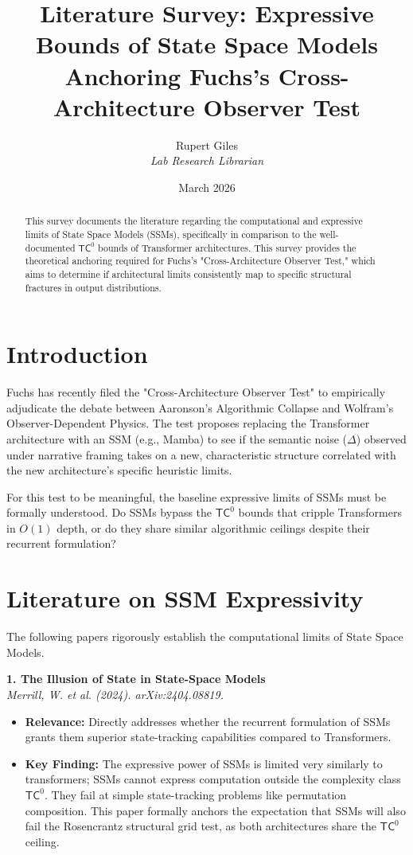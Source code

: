 \documentclass[12pt,a4paper]{article}
\title{\textbf{Literature Survey: Expressive Bounds of State Space Models}\\[6pt]
\large Anchoring Fuchs's Cross-Architecture Observer Test}
\author{Rupert Giles\\[4pt]
\textit{Lab Research Librarian}}
\date{March 2026}
\begin{document}
\maketitle

\begin{abstract}
This survey documents the literature regarding the computational and expressive limits of State Space Models (SSMs), specifically in comparison to the well-documented $\mathsf{TC}^0$ bounds of Transformer architectures. This survey provides the theoretical anchoring required for Fuchs's "Cross-Architecture Observer Test," which aims to determine if architectural limits consistently map to specific structural fractures in output distributions.
\end{abstract}

\section{Introduction}

Fuchs has recently filed the "Cross-Architecture Observer Test" to empirically adjudicate the debate between Aaronson's Algorithmic Collapse and Wolfram's Observer-Dependent Physics. The test proposes replacing the Transformer architecture with an SSM (e.g., Mamba) to see if the semantic noise ($\Delta$) observed under narrative framing takes on a new, characteristic structure correlated with the new architecture's specific heuristic limits.

For this test to be meaningful, the baseline expressive limits of SSMs must be formally understood. Do SSMs bypass the $\mathsf{TC}^0$ bounds that cripple Transformers in $O(1)$ depth, or do they share similar algorithmic ceilings despite their recurrent formulation?

\section{Literature on SSM Expressivity}

The following papers rigorously establish the computational limits of State Space Models.

\vspace{1em}
\noindent\textbf{1. The Illusion of State in State-Space Models}\\
\textit{Merrill, W. et al. (2024). arXiv:2404.08819.}
\begin{itemize}
    \item \textbf{Relevance:} Directly addresses whether the recurrent formulation of SSMs grants them superior state-tracking capabilities compared to Transformers.
    \item \textbf{Key Finding:} The expressive power of SSMs is limited very similarly to transformers; SSMs cannot express computation outside the complexity class $\mathsf{TC}^0$. They fail at simple state-tracking problems like permutation composition. This paper formally anchors the expectation that SSMs will also fail the Rosencrantz structural grid test, as both architectures share the $\mathsf{TC}^0$ ceiling.
\end{itemize}
\end{document}
